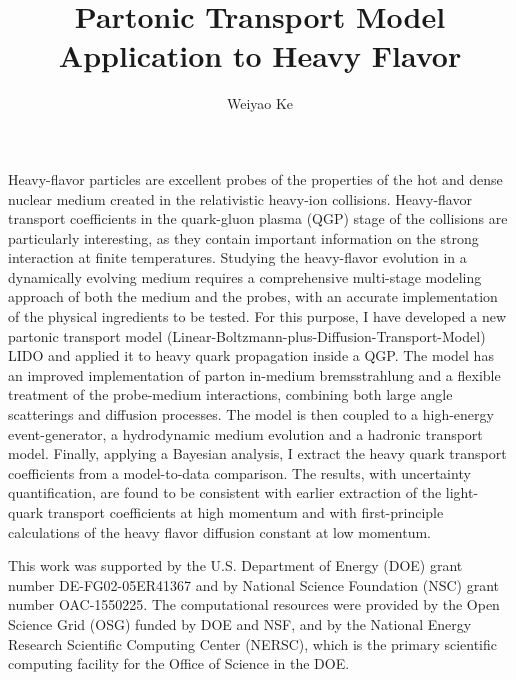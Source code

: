\documentclass[PhD]{dukethesis2006}
\author{Weiyao Ke}
\title{Partonic Transport Model Application to Heavy Flavor}
\begin{document}
\maketitle

\makeabstract

\Copyright

\abstract
\doublespacing
Heavy-flavor particles are excellent probes of the properties of the hot and dense nuclear medium created in the relativistic heavy-ion collisions.
Heavy-flavor transport coefficients in the quark-gluon plasma (QGP) stage of the collisions are particularly interesting, as they contain important information on the strong interaction at finite temperatures.
Studying the heavy-flavor evolution in a dynamically evolving medium requires a comprehensive multi-stage modeling approach of both the medium and the probes, with an accurate implementation of the physical ingredients to be tested.
For this purpose, I have developed a new partonic transport model (Linear-Boltzmann-plus-Diffusion-Transport-Model) LIDO and applied it to heavy quark propagation inside a QGP.
The model has an improved implementation of parton in-medium bremsstrahlung and a flexible treatment of the probe-medium interactions, combining both large angle scatterings and diffusion processes.
The model is then coupled to a high-energy event-generator, a hydrodynamic medium evolution and a hadronic transport model.
Finally, applying a Bayesian analysis, I extract the heavy quark transport coefficients from a model-to-data comparison.
The results, with uncertainty quantification, are found to be consistent with earlier extraction of the light-quark transport coefficients at high momentum and with first-principle calculations of the heavy flavor diffusion constant at low momentum.

\acknowledgements
This work was supported by the U.S. Department of Energy (DOE) grant number DE-FG02-05ER41367 and by National Science Foundation (NSC) grant number OAC-1550225.
The computational resources were provided by the Open Science Grid (OSG) funded by DOE and NSF, and by the National Energy Research Scientific Computing Center (NERSC), which is the primary scientific computing facility for the Office of Science in the DOE.


\singlespacing
\tableofcontents
\listoffigures
\listoftables

\end{document}
